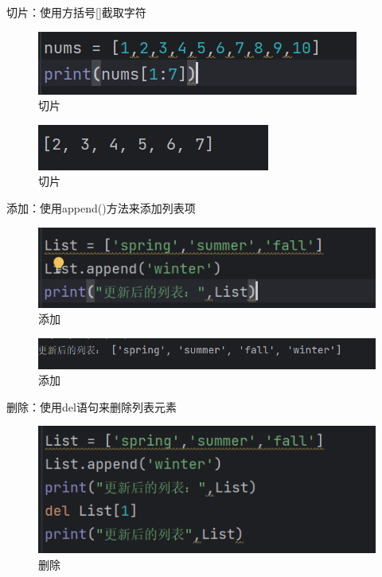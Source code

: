\documentclass{ctexart}
\begin{document}
	切片：使用方括号[]截取字符
	
	\begin{figure}[H]
		\centering
		\includegraphics[scale=0.5]{3.28}
		\caption{切片}
	\end{figure}
	
	\begin{figure}[H]
		\centering
		\includegraphics[scale=0.5]{3.29}
		\caption{切片}
	\end{figure}
	
	添加：使用append()方法来添加列表项
	
	\begin{figure}[H]
		\centering
		\includegraphics[scale=0.5]{3.30}
		\caption{添加}
	\end{figure}
	
	\begin{figure}[H]
		\centering
		\includegraphics[scale=0.5]{3.31}
		\caption{添加}
	\end{figure}
	
	删除：使用del语句来删除列表元素
	
	\begin{figure}[H]
		\centering
		\includegraphics[scale=0.5]{3.32}
		\caption{删除}
	\end{figure}
	
\end{document}
